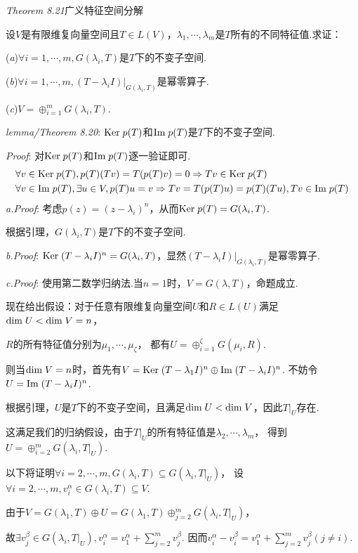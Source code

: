 \textit{Theorem 8.21}{\kaishu 广义特征空间分解}

设$V$是有限维复向量空间且$T \in L(V)$，$\lambda_1,\cdots,\lambda_m$是$T$所有的不同特征值.求证：

(\textit{a})$\forall i=1,\cdots,m,G(\lambda_i,T)$是$T$下的不变子空间.

(\textit{b})$\forall i=1,\cdots,m,(T-\lambda_i I)|_{G(\lambda_i,T)}$是幂零算子.

(\textit{c})$V=\oplus_{i=1}^m G(\lambda_i,T)$.

\textit{lemma/Theorem 8.20}:
$\mathrm{Ker \;} p(T)$和$\mathrm{Im \;} p(T)$是$T$下的不变子空间.

\textit{Proof}:
    对$\mathrm{Ker \;} p(T)$和$\mathrm{Im \;} p(T)$逐一验证即可.
    \begin{align*}
        &\forall v \in \mathrm{Ker \;} p(T),p(T)(Tv)=T(p(T)v)=0 \Rightarrow Tv \in \mathrm{Ker \;} p(T) \\
        &\forall v \in \mathrm{Im \;} p(T),\exists u \in V,p(T)u=v \Rightarrow Tv=T(p(T)u)=p(T)(Tu),Tv \in \mathrm{Im \;} p(T)
    \end{align*}
\textit{a.Proof}:
考虑$p(z)=(z-\lambda_i)^n$，从而$\mathrm{Ker \;} p(T)=G(\lambda_i,T)$.

根据引理，$G(\lambda_i,T)$是$T$下的不变子空间.

\textit{b.Proof}:
$\mathrm{Ker \;} (T-\lambda_i I)^n=G(\lambda_i,T)$，显然$(T-\lambda_i I)|_{G(\lambda_i,T)}$是幂零算子.

\textit{c.Proof}:
使用第二数学归纳法.当$n=1$时，$V=G(\lambda,T)$，命题成立.

现在给出假设：对于任意有限维复向量空间$U$和$R \in L(U)$满足$\mathrm{dim \;} U<\mathrm{dim \;} V=n$，

$R$的所有特征值分别为$\mu_1,\cdots,\mu_\zeta$，
都有$U=\oplus_{i=1}^\zeta G(\mu_i,R)$.

则当$\mathrm{dim \;} V=n$时，首先有$V=\mathrm{Ker \;} (T-\lambda_1 I)^n \oplus \mathrm{Im \;} (T-\lambda_i I)^n$.
不妨令$U=\mathrm{Im \;} (T-\lambda_i I)^n$.

根据引理，$U$是$T$下的不变子空间，且满足$\mathrm{dim \;} U<\mathrm{dim \;} V$，因此$T|_U$存在.

这满足我们的归纳假设，由于$T|_U$的所有特征值是$\lambda_2,\cdots,\lambda_m$，
得到$U=\oplus_{i=2}^m G(\lambda_i,T|_U)$.

以下将证明$\forall i=2,\cdots,m,G(\lambda_i,T) \subseteq G(\lambda_i,T|_U)$，
设$\forall i=2,\cdots,m,v_i^\alpha \in G(\lambda_i,T) \subseteq V$.

由于$V=G(\lambda_1,T) \oplus U=G(\lambda_1,T) \oplus_{j=2}^m G(\lambda_i,T|_U)$，

故$\exists v_j^\beta \in G(\lambda_i,T|_U),v_i^\alpha=v_1^\alpha+\sum_{j=2}^m v_j^\beta$.
因而$v_i^\alpha-v_i^\beta=v_1^\alpha+\sum_{j=2}^m v_j^\beta(j \ne i)$.


